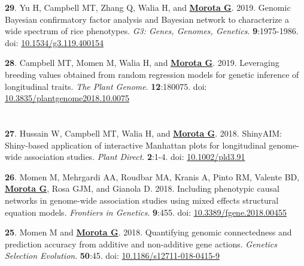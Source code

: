 \documentclass[margin,line,10pt]{res}
\newenvironment{list1}{
  \begin{list}{\ding{113}}{%
      \setlength{\itemsep}{0in}
      \setlength{\parsep}{0in} \setlength{\parskip}{0in}
      \setlength{\topsep}{0in} \setlength{\partopsep}{0in} 
      \setlength{\leftmargin}{0.17in}}}{\end{list}}
\begin{document}
\begin{resume}
\begin{list1}
\item  [{\bf 29}.] Yu H, Campbell MT, Zhang Q, Walia H, and \textbf{\underline{Morota G}}. 2019. Genomic Bayesian confirmatory factor analysis and Bayesian network to characterize a wide spectrum of rice phenotypes. \emph{G3: Genes, Genomes, Genetics}. \textbf{9}:1975-1986. doi: \textcolor{blue}{\href{https://doi.org/10.1534/g3.119.400154}{10.1534/g3.119.400154}}

  \vspace{0.5cm}
  
\item  [{\bf 28}.] Campbell MT, Momen M, Walia H, and \textbf{\underline{Morota G}}. 2019. Leveraging breeding values obtained from random regression models for genetic inference of longitudinal traits. \emph{The Plant Genome}. \textbf{12}:180075. doi: \textcolor{blue}{\href{https://doi.org/10.3835/plantgenome2018.10.0075}{10.3835/plantgenome2018.10.0075}}

\end{list1}


\section{}
\begin{list1}

\item  [{\bf 27}.] Hussain W, Campbell MT, Walia H, and \textbf{\underline{Morota G}}. 2018. ShinyAIM: Shiny-based application of interactive Manhattan plots for longitudinal genome-wide association studies. \emph{Plant Direct}. \textbf{2}:1-4. doi: \textcolor{blue}{\href{https://doi.org/10.1002/pld3.91}{10.1002/pld3.91}}

   \vspace{0.5cm}
  
\item  [{\bf 26}.] Momen M, Mehrgardi AA, Roudbar MA, Kranis A, Pinto RM, Valente BD, \textbf{\underline{Morota G}}, Rosa GJM, and Gianola D. 2018. Including phenotypic causal networks in genome-wide association studies using mixed effects structural equation models. \emph{Frontiers in Genetics}. \textbf{9}:455. doi: \textcolor{blue}{\href{https://doi.org/10.3389/fgene.2018.00455}{10.3389/fgene.2018.00455}}

  \vspace{0.5cm}
  
\item  [{\bf 25}.] Momen M and  \textbf{\underline{Morota G}}. 2018. Quantifying genomic connectedness and prediction accuracy from additive and non-additive gene actions. \emph{Genetics Selection Evolution}. \textbf{50}:45. doi: \textcolor{blue}{\href{https://doi.org/10.1186/s12711-018-0415-9}{10.1186/s12711-018-0415-9}}


\end{list1}
\end{resume}
\end{document}
